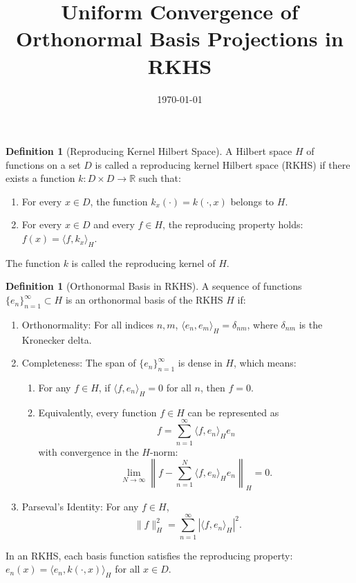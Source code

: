 \documentclass{article}
\theoremstyle{definition}
\newtheorem{definition}[theorem]{Definition}
\begin{document}
\title{Uniform Convergence of Orthonormal Basis Projections in RKHS}
\author{}
\date{\today}
\maketitle

\begin{definition}[Reproducing Kernel Hilbert Space]
A Hilbert space $H$ of functions on a set $D$ is called a reproducing kernel Hilbert space (RKHS) if there exists a function $k: D \times D \to \mathbb{R}$ such that:
\begin{enumerate}
    \item For every $x \in D$, the function $k_x(\cdot) = k(\cdot, x)$ belongs to $H$.
    \item For every $x \in D$ and every $f \in H$, the reproducing property holds: $f(x) = \langle f, k_x \rangle_H$.
\end{enumerate}
The function $k$ is called the reproducing kernel of $H$.
\end{definition}

\begin{definition}[Orthonormal Basis in RKHS]
\label{def:orthonormal_basis}
A sequence of functions $\{e_n\}_{n=1}^{\infty} \subset H$ is an orthonormal basis of the RKHS $H$ if:
\begin{enumerate}
    \item Orthonormality: For all indices $n, m$, $\langle e_n, e_m \rangle_H = \delta_{nm}$, where $\delta_{nm}$ is the Kronecker delta.
    \item Completeness: The span of $\{e_n\}_{n=1}^{\infty}$ is dense in $H$, which means:
    \begin{enumerate}
        \item For any $f \in H$, if $\langle f, e_n \rangle_H = 0$ for all $n$, then $f = 0$.
        \item Equivalently, every function $f \in H$ can be represented as
        \[
        f = \sum_{n=1}^{\infty} \langle f, e_n \rangle_H e_n
        \]
        with convergence in the $H$-norm:
        \[
        \lim_{N\to\infty} \left\|f - \sum_{n=1}^{N} \langle f, e_n \rangle_H e_n\right\|_H = 0.
        \]
    \end{enumerate}
    \item Parseval's Identity: For any $f \in H$,
    \[
    \|f\|_H^2 = \sum_{n=1}^{\infty} |\langle f, e_n \rangle_H|^2.
    \]
\end{enumerate}
In an RKHS, each basis function satisfies the reproducing property: $e_n(x) = \langle e_n, k(\cdot,x) \rangle_H$ for all $x \in D$.
\end{definition}
\end{document}

